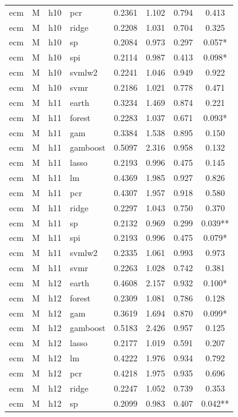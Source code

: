 \begin{ThreePartTable}
\begin{longtable}[t]{llclcccc}
ecm & M & h10 & pcr & 0.2361 & 1.102 & 0.794 & 0.413\\
ecm & M & h10 & ridge & 0.2208 & 1.031 & 0.704 & 0.325\\
ecm & M & h10 & sp & 0.2084 & 0.973 & 0.297 & 0.057*\\
ecm & M & h10 & spi & 0.2114 & 0.987 & 0.413 & 0.098*\\
ecm & M & h10 & svmlw2 & 0.2241 & 1.046 & 0.949 & 0.922\\
ecm & M & h10 & svmr & 0.2186 & 1.021 & 0.778 & 0.471\\
\addlinespace
ecm & M & h11 & earth & 0.3234 & 1.469 & 0.874 & 0.221\\
ecm & M & h11 & forest & 0.2283 & 1.037 & 0.671 & 0.093*\\
ecm & M & h11 & gam & 0.3384 & 1.538 & 0.895 & 0.150\\
ecm & M & h11 & gamboost & 0.5097 & 2.316 & 0.958 & 0.132\\
ecm & M & h11 & lasso & 0.2193 & 0.996 & 0.475 & 0.145\\
ecm & M & h11 & lm & 0.4369 & 1.985 & 0.927 & 0.826\\
ecm & M & h11 & pcr & 0.4307 & 1.957 & 0.918 & 0.580\\
ecm & M & h11 & ridge & 0.2297 & 1.043 & 0.750 & 0.370\\
ecm & M & h11 & sp & 0.2132 & 0.969 & 0.299 & 0.039**\\
ecm & M & h11 & spi & 0.2193 & 0.996 & 0.475 & 0.079*\\
ecm & M & h11 & svmlw2 & 0.2335 & 1.061 & 0.993 & 0.973\\
ecm & M & h11 & svmr & 0.2263 & 1.028 & 0.742 & 0.381\\
\addlinespace
ecm & M & h12 & earth & 0.4608 & 2.157 & 0.932 & 0.100*\\
ecm & M & h12 & forest & 0.2309 & 1.081 & 0.786 & 0.128\\
ecm & M & h12 & gam & 0.3619 & 1.694 & 0.870 & 0.099*\\
ecm & M & h12 & gamboost & 0.5183 & 2.426 & 0.957 & 0.125\\
ecm & M & h12 & lasso & 0.2177 & 1.019 & 0.591 & 0.207\\
ecm & M & h12 & lm & 0.4222 & 1.976 & 0.934 & 0.792\\
ecm & M & h12 & pcr & 0.4218 & 1.975 & 0.935 & 0.696\\
ecm & M & h12 & ridge & 0.2247 & 1.052 & 0.739 & 0.353\\
ecm & M & h12 & sp & 0.2099 & 0.983 & 0.407 & 0.042**\\

\end{longtable}
\end{ThreePartTable}
